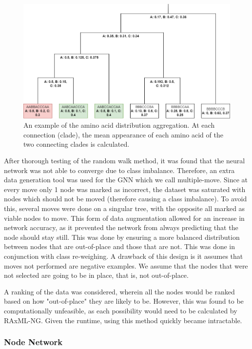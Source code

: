 \documentclass{mpaper}
\begin{document}
\begin{figure}
    \includegraphics[width=1\linewidth]{dissertation/images/GNN_feature_generator.png}
    \centering
    \caption{An example of the amino acid distribution aggregation. At each connection (clade), the mean appearance of each amino acid of the two connecting clades is calculated.}
\end{figure}

After thorough testing of the random walk method, it was found that the neural network was not able to converge due to class imbalance. Therefore, an extra data generation tool was used for the GNN which we call multiple-move. Since at every move only 1 node was marked as incorrect, the dataset was saturated with nodes which should not be moved (therefore causing a class imbalance). To avoid this, several moves were done on a singular tree, with the opposite all marked as viable nodes to move. This form of data augmentation allowed for an increase in network accuracy, as it prevented the network from always predicting that the node should stay still. This was done by ensuring a more balanced distribution between nodes that are out-of-place and those that are not. This was done in conjunction with class re-weighing. A drawback of this design is it assumes that moves not performed are negative examples. We assume that the nodes that were not selected are going to be in place, that is, not out-of-place.

A ranking of the data was considered, wherein all the nodes would be ranked based on how "out-of-place" they are likely to be. However, this was found to be computationally unfeasible, as each possibility would need to be calculated by RAxML-NG. Given the runtime, using this method quickly became intractable.


\subsubsection{Node Network}
\end{document}
